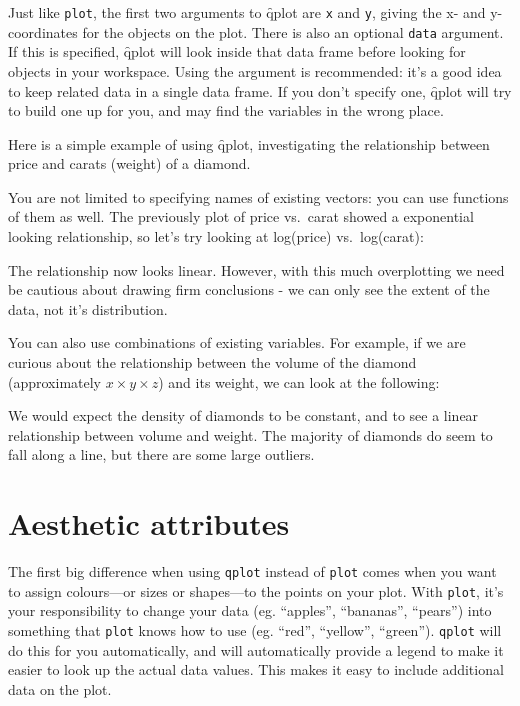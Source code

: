 Just like {\tt plot}, the first two arguments to \f{qplot} are {\tt x} and {\tt y}, giving the x- and y-coordinates for the objects on the plot. There is also an optional {\tt data} argument.  If this is specified, \f{qplot} will look inside that data frame before looking for objects in your workspace.  Using the  argument is recommended: it's a good idea to keep related data in a single data frame.  If you don't specify one, \f{qplot} will try to build one up for you, and may find the variables in the wrong place.

Here is a simple example of using \f{qplot}, investigating the relationship between price and carats (weight) of a diamond.  

% 



You are not limited to specifying names of existing vectors: you can use functions of them as well.  The previously plot of price vs.\ carat showed a exponential looking relationship, so let's try looking at log(price) vs.\ log(carat):

% 


\noindent The relationship now looks linear.  However, with this much overplotting we need be cautious about drawing firm conclusions - we can only see the extent of the data, not it's distribution.

You can also use combinations of existing variables.  For example, if we are curious about the relationship between the volume of the diamond (approximately $x \times y \times z$) and its weight, we can look at the following:

% 


We would expect the density of diamonds to be constant, and to see a linear relationship between volume and weight. The majority of diamonds do seem to fall along a line, but there are some large outliers.

\section{Aesthetic attributes}\label{sec:aesthetic_attributes}

The first big difference when using {\tt qplot} instead of {\tt plot} comes when you want to assign colours---or sizes or shapes---to the points on your plot.  With {\tt plot}, it's your responsibility to change your data (eg. ``apples'', ``bananas'', ``pears'') into something that {\tt plot} knows how to use (eg. ``red'', ``yellow'', ``green'').  {\tt qplot} will do this for you automatically, and will automatically provide a legend to make it easier to look up the actual data values.  This makes it easy to include additional data on the plot.  

